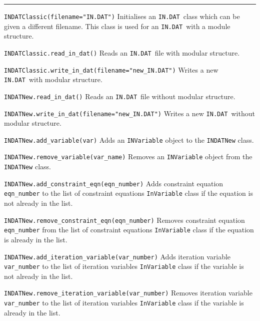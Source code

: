 \documentclass[11pt,a4paper]{report}
\newcommand{\indat}{\mbox{\texttt{IN.DAT}}}
\begin{document}
\rule{\textwidth}{0.4pt}

\begin{description}

\item{\verb|INDATClassic(filename="IN.DAT")| } Initialises an \indat\ class
  which can be given a different filename. This class is used for an \indat\
  with a module structure.

\item{\verb|INDATClassic.read_in_dat()| } Reads an \indat\ file with modular
  structure.

\item{\verb|INDATClassic.write_in_dat(filename="new_IN.DAT")| } Writes a new
  \indat\ with modular structure.

\item{\verb|INDATNew.read_in_dat()| } Reads an \indat\ file without modular
  structure.

\item{\verb|INDATNew.write_in_dat(filename="new_IN.DAT")| } Writes a new
  \indat\ without modular structure.

\item{\verb|INDATNew.add_variable(var)| } Adds an \verb|INVariable| object to
  the \verb|INDATNew| class.

\item{\verb|INDATNew.remove_variable(var_name)| } Removes an
  \verb|INVariable| object from the \verb|INDATNew| class.

\item{\verb|INDATNew.add_constraint_eqn(eqn_number)|} Adds constraint
  equation \verb|eqn_number| to the list of constraint equations
  \verb|InVariable| class if the equation is not already in the list.

\item{\verb|INDATNew.remove_constraint_eqn(eqn_number)|} Removes
  constraint equation \verb|eqn_number| from the list of constraint
  equations \verb|InVariable| class if the equation is already in the list.

\item{\verb|INDATNew.add_iteration_variable(var_number)| } Adds iteration
  variable \verb|var_number| to the list of iteration variables
  \verb|InVariable| class if the variable is not already in the list.

\item{\verb|INDATNew.remove_iteration_variable(var_number)| } Removes
  iteration variable \verb|var_number| to the list of iteration variables
  \verb|InVariable| class if the variable is already in the list.

\end{description}
\end{document}
